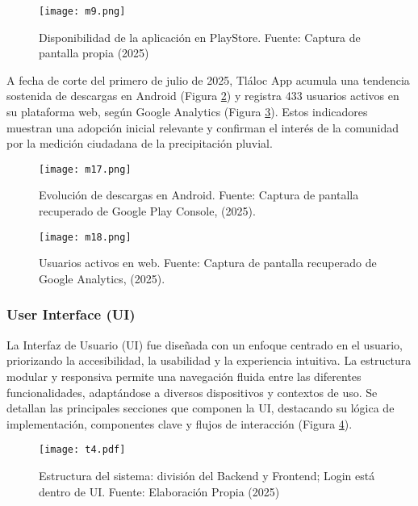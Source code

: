 \begin{figure}[h!]
\centering
  \texttt{[image: m9.png]}
  \caption{Disponibilidad de la aplicación en PlayStore. Fuente: Captura de pantalla propia (2025)}
  \label{m9}
\end{figure}



A fecha de corte del primero de julio de 2025, Tláloc App acumula una tendencia sostenida de descargas en Android (Figura \ref{m17}) y registra 433 usuarios activos en su plataforma web, según Google Analytics (Figura \ref{m18}). Estos indicadores muestran una adopción inicial relevante y confirman el interés de la comunidad por la medición ciudadana de la precipitación pluvial.

\begin{figure}[h!]
  \centering
  \texttt{[image: m17.png]}
  \caption{Evolución de descargas en Android. Fuente: Captura de pantalla recuperado de Google Play Console, (2025).}
  \label{m17}
\end{figure}

\begin{figure}[h!]
  \centering
  \texttt{[image: m18.png]}
  \caption{Usuarios activos en web. Fuente: Captura de pantalla recuperado de Google Analytics, (2025).}
  \label{m18}
\end{figure}







\newpage
\subsubsection{User Interface (UI)}
La Interfaz de Usuario (UI) fue diseñada con un enfoque centrado en el usuario, priorizando la accesibilidad, la usabilidad y la experiencia intuitiva. La estructura modular y responsiva permite una navegación fluida entre las diferentes funcionalidades, adaptándose a diversos dispositivos y contextos de uso. Se detallan las principales secciones que componen la UI, destacando su lógica de implementación, componentes clave y flujos de interacción (Figura \ref{m10}).

\begin{figure}[h!]
\centering
  \texttt{[image: t4.pdf]}
  \caption{Estructura del sistema: división del Backend y Frontend; Login está dentro de UI.  Fuente: Elaboración Propia (2025)}
  \label{m10}
\end{figure}

